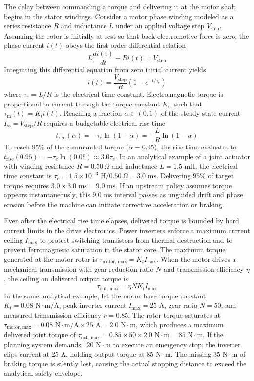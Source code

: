 \documentclass[
  letterpaper,
  DIV=11,
  numbers=noendperiod]{scrartcl}
\begin{document}
The delay between commanding a torque and delivering it at the motor
shaft begins in the stator windings. Consider a motor phase winding
modeled as a series resistance \(R\) and inductance \(L\) under an
applied voltage step \(V_{\text{step}}\). Assuming the rotor is
initially at rest so that back-electromotive force is zero, the phase
current \(i(t)\) obeys the first-order differential relation
\[L \frac{di(t)}{dt} + R i(t) = V_{\text{step}}\] Integrating this
differential equation from zero initial current yields
\[i(t) = \frac{V_{\text{step}}}{R} \left( 1 - e^{-t / \tau_e} \right)\]
where \(\tau_e = L / R\) is the electrical time constant.
Electromagnetic torque is proportional to current through the torque
constant \(K_t\), such that \(\tau_{\text{m}}(t) = K_t i(t)\). Reaching
a fraction \(\alpha \in (0, 1)\) of the steady-state current
\(I_{\text{ss}} = V_{\text{step}} / R\) requires a budgetable electrical
rise time
\[t_{\text{rise}}(\alpha) = -\tau_e \ln(1 - \alpha) = -\frac{L}{R} \ln(1 - \alpha)\]
To reach \(95\%\) of the commanded torque (\(\alpha = 0.95\)), the rise
time evaluates to
\(t_{\text{rise}}(0.95) = -\tau_e \ln(0.05) \approx 3.0 \tau_e\). In an
analytical example of a joint actuator with winding resistance
\(R = 0.50\,\Omega\) and inductance \(L = 1.5\text{ mH}\), the
electrical time constant is
\(\tau_e = 1.5\times 10^{-3}\text{ H} / 0.50\,\Omega = 3.0\text{ ms}\).
Delivering \(95\%\) of target torque requires
\(3.0 \times 3.0\text{ ms} = 9.0\text{ ms}\). If an upstream policy
assumes torque appears instantaneously, this \(9.0\text{ ms}\) interval
passes as unguided drift and phase erosion before the machine can
initiate corrective acceleration or braking.

Even after the electrical rise time elapses, delivered torque is bounded
by hard current limits in the drive electronics. Power inverters enforce
a maximum current ceiling \(I_{\text{max}}\) to protect switching
transistors from thermal destruction and to prevent ferromagnetic
saturation in the stator core. The maximum torque generated at the motor
rotor is \(\tau_{\text{motor, max}} = K_t I_{\text{max}}\). When the
motor drives a mechanical transmission with gear reduction ratio \(N\)
and transmission efficiency \(\eta\), the ceiling on delivered output
torque is \[\tau_{\text{out, max}} = \eta N K_t I_{\text{max}}\] In the
same analytical example, let the motor have torque constant
\(K_t = 0.08\text{ N}\cdot\text{m/A}\), peak inverter current
\(I_{\text{max}} = 25\text{ A}\), gear ratio \(N = 50\), and measured
transmission efficiency \(\eta = 0.85\). The rotor torque saturates at
\(\tau_{\text{motor, max}} = 0.08\text{ N}\cdot\text{m/A} \times 25\text{ A} = 2.0\text{ N}\cdot\text{m}\),
which produces a maximum delivered joint torque of
\(\tau_{\text{out, max}} = 0.85 \times 50 \times 2.0\text{ N}\cdot\text{m} = 85\text{ N}\cdot\text{m}\).
If the planning system demands \(120\text{ N}\cdot\text{m}\) to execute
an emergency stop, the inverter clips current at \(25\text{ A}\),
holding output torque at \(85\text{ N}\cdot\text{m}\). The missing
\(35\text{ N}\cdot\text{m}\) of braking torque is silently lost, causing
the actual stopping distance to exceed the analytical safety envelope.
\end{document}
